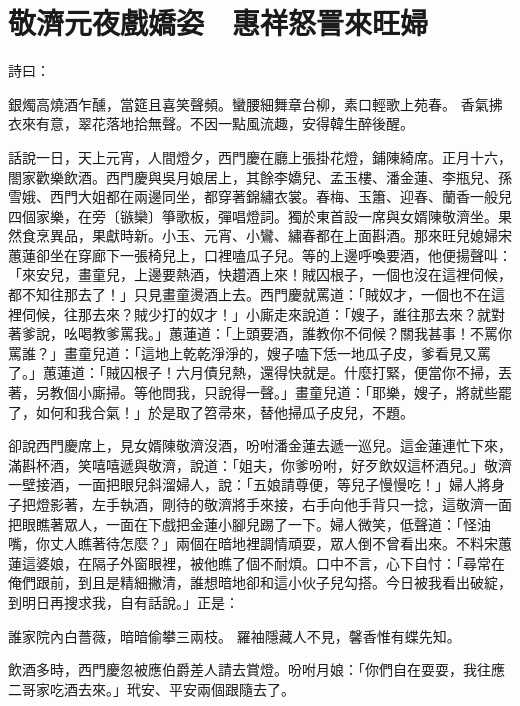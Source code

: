 %

\chapter{敬濟元夜戲嬌姿　惠祥怒詈來旺婦}


\begin{showcontents}{}


詩曰：

銀燭高燒酒乍醺，當筵且喜笑聲頻。蠻腰細舞章台柳，素口輕歌上苑春。
香氣拂衣來有意，翠花落地拾無聲。不因一點風流趣，安得韓生醉後醒。

話說一日，天上元宵，人間燈夕，西門慶在廳上張掛花燈，鋪陳綺席。正月十六，閤家歡樂飲酒。西門慶與吳月娘居上，其餘李嬌兒、孟玉樓、潘金蓮、李瓶兒、孫雪娥、西門大姐都在兩邊同坐，都穿著錦繡衣裳。春梅、玉簫、迎春、蘭香一般兒四個家樂，在旁〔镞欒〕箏歌板，彈唱燈詞。獨於東首設一席與女婿陳敬濟坐。果然食烹異品，果獻時新。小玉、元宵、小鸞、繡春都在上面斟酒。那來旺兒媳婦宋蕙蓮卻坐在穿廊下一張椅兒上，口裡嗑瓜子兒。等的上邊呼喚要酒，他便揚聲叫： 「來安兒，畫童兒，上邊要熱酒，快趲酒上來！賊囚根子，一個也沒在這裡伺候，都不知往那去了！」只見畫童燙酒上去。西門慶就罵道：「賊奴才，一個也不在這裡伺候，往那去來？賊少打的奴才！」小廝走來說道：「嫂子，誰往那去來？就對著爹說，吆喝教爹罵我。」蕙蓮道：「上頭要酒，誰教你不伺候？關我甚事！不罵你罵誰？」畫童兒道：「這地上乾乾淨淨的，嫂子嗑下恁一地瓜子皮，爹看見又罵了。」蕙蓮道：「賊囚根子！六月債兒熱，還得快就是。什麼打緊，便當你不掃，丟著，另教個小廝掃。等他問我，只說得一聲。」畫童兒道：「耶樂，嫂子，將就些罷了，如何和我合氣！」於是取了笤帚來，替他掃瓜子皮兒，不題。

卻說西門慶席上，見女婿陳敬濟沒酒，吩咐潘金蓮去遞一巡兒。這金蓮連忙下來，滿斟杯酒，笑嘻嘻遞與敬濟，說道：「姐夫，你爹吩咐，好歹飲奴這杯酒兒。」敬濟一壁接酒，一面把眼兒斜溜婦人，說：「五娘請尊便，等兒子慢慢吃！」婦人將身子把燈影著，左手執酒，剛待的敬濟將手來接，右手向他手背只一捻，這敬濟一面把眼瞧著眾人，一面在下戲把金蓮小腳兒踢了一下。婦人微笑，低聲道：「怪油嘴，你丈人瞧著待怎麼？」兩個在暗地裡調情頑耍，眾人倒不曾看出來。不料宋蕙蓮這婆娘，在隔子外窗眼裡，被他瞧了個不耐煩。口中不言，心下自忖：「尋常在俺們跟前，到且是精細撇清，誰想暗地卻和這小伙子兒勾搭。今日被我看出破綻，到明日再搜求我，自有話說。」正是：

誰家院內白薔薇，暗暗偷攀三兩枝。
羅袖隱藏人不見，馨香惟有蝶先知。

飲酒多時，西門慶忽被應伯爵差人請去賞燈。吩咐月娘：「你們自在耍耍，我往應二哥家吃酒去來。」玳安、平安兩個跟隨去了。


\end{showcontents}
